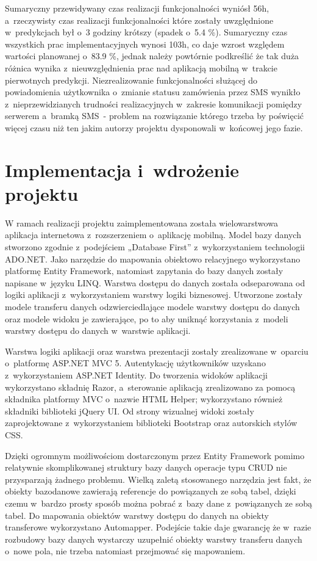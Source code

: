 \documentclass[a4paper,11pt]{article}
\begin{document}
Sumaryczny przewidywany czas realizacji funkcjonalności wyniósł 56h, a~rzeczywisty czas realizacji funkcjonalności które zostały uwzględnione w~predykcjach był o~3 godziny krótszy (spadek o~5.4 \%). Sumaryczny czas wszystkich prac implementacyjnych wynosi 103h, co daje wzrost względem wartości planowanej o~83.9 \%, jednak należy powtórnie podkreślić że tak duża różnica wynika z~nieuwzględnienia prac nad aplikacją mobilną w~trakcie pierwotnych predykcji. Niezrealizowanie funkcjonalności służącej do powiadomienia użytkownika o~zmianie statusu zamówienia przez SMS wynikło z~nieprzewidzianych trudności realizacyjnych w~zakresie komunikacji pomiędzy serwerem a~bramką SMS~- problem na rozwiązanie którego trzeba by poświęcić więcej czasu niż ten jakim autorzy projektu dysponowali w~końcowej jego fazie.

\section{Implementacja i~wdrożenie projektu}
W ramach realizacji projektu zaimplementowana została wielowarstwowa aplikacja internetowa z~rozszerzeniem o~aplikację mobilną. Model bazy danych stworzono zgodnie z~podejściem „Database First” z~wykorzystaniem technologii ADO.NET. Jako narzędzie do mapowania obiektowo relacyjnego wykorzystano platformę Entity Framework, natomiast zapytania do bazy danych zostały napisane w~języku LINQ. Warstwa dostępu do danych została odseparowana od logiki aplikacji z~wykorzystaniem warstwy logiki biznesowej. Utworzone zostały modele transferu danych odzwierciedlające modele warstwy dostępu do danych oraz modele widoku je zawierające, po to aby uniknąć korzystania z~modeli warstwy dostępu do danych w~warstwie aplikacji.

Warstwa logiki aplikacji oraz warstwa prezentacji zostały zrealizowane w~oparciu o~platformę ASP.NET MVC 5. Autentykację użytkowników uzyskano z~wykorzystaniem ASP.NET Identity. Do tworzenia widoków aplikacji wykorzystano składnię Razor, a~sterowanie aplikacją zrealizowano za pomocą składnika platformy MVC o~nazwie HTML Helper; wykorzystano również składniki biblioteki jQuery UI. Od strony wizualnej widoki zostały zaprojektowane z~wykorzystaniem biblioteki Bootstrap oraz autorskich stylów CSS.

Dzięki ogromnym możliwościom dostarczonym przez Entity Framework pomimo relatywnie skomplikowanej struktury bazy danych operacje typu CRUD nie przysparzają żadnego problemu. Wielką zaletą stosowanego narzędzia jest fakt, że obiekty bazodanowe zawierają referencje do powiązanych ze sobą tabel, dzięki czemu w~bardzo prosty sposób można pobrać z~bazy dane z~powiązanych ze sobą tabel. Do mapowania obiektów warstwy dostępu do danych na obiekty transferowe wykorzystano Automapper. Podejście takie daje gwarancję że w~razie rozbudowy bazy danych wystarczy uzupełnić obiekty warstwy transferu danych o~nowe pola, nie trzeba natomiast przejmować się mapowaniem.
\end{document}
